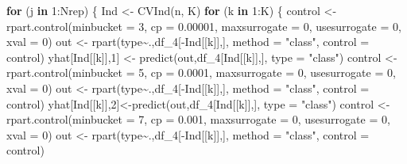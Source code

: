 \documentclass[
]{article}
\newenvironment{Shaded}{\begin{snugshade}}{\end{snugshade}}
\newcommand{\AttributeTok}[1]{\textcolor[rgb]{0.77,0.63,0.00}{#1}}
\newcommand{\ControlFlowTok}[1]{\textcolor[rgb]{0.13,0.29,0.53}{\textbf{#1}}}
\newcommand{\DecValTok}[1]{\textcolor[rgb]{0.00,0.00,0.81}{#1}}
\newcommand{\FloatTok}[1]{\textcolor[rgb]{0.00,0.00,0.81}{#1}}
\newcommand{\FunctionTok}[1]{\textcolor[rgb]{0.00,0.00,0.00}{#1}}
\newcommand{\NormalTok}[1]{#1}
\newcommand{\OtherTok}[1]{\textcolor[rgb]{0.56,0.35,0.01}{#1}}
\newcommand{\SpecialCharTok}[1]{\textcolor[rgb]{0.00,0.00,0.00}{#1}}
\newcommand{\StringTok}[1]{\textcolor[rgb]{0.31,0.60,0.02}{#1}}
\begin{document}
\begin{Shaded}
\begin{Highlighting}[]
\ControlFlowTok{for}\NormalTok{ (j }\ControlFlowTok{in} \DecValTok{1}\SpecialCharTok{:}\NormalTok{Nrep) \{}
\NormalTok{  Ind }\OtherTok{\textless{}{-}} \FunctionTok{CVInd}\NormalTok{(n, K)}
  \ControlFlowTok{for}\NormalTok{ (k }\ControlFlowTok{in} \DecValTok{1}\SpecialCharTok{:}\NormalTok{K) \{}
\NormalTok{    control }\OtherTok{\textless{}{-}} \FunctionTok{rpart.control}\NormalTok{(}\AttributeTok{minbucket =} \DecValTok{3}\NormalTok{, }\AttributeTok{cp =} \FloatTok{0.00001}\NormalTok{, }\AttributeTok{maxsurrogate =} \DecValTok{0}\NormalTok{, }\AttributeTok{usesurrogate =} \DecValTok{0}\NormalTok{, }\AttributeTok{xval =} \DecValTok{0}\NormalTok{)}
\NormalTok{    out }\OtherTok{\textless{}{-}} \FunctionTok{rpart}\NormalTok{(type}\SpecialCharTok{\textasciitilde{}}\NormalTok{.,df\_4[}\SpecialCharTok{{-}}\NormalTok{Ind[[k]],], }\AttributeTok{method =} \StringTok{"class"}\NormalTok{, }\AttributeTok{control =}\NormalTok{ control)}
\NormalTok{    yhat[Ind[[k]],}\DecValTok{1}\NormalTok{] }\OtherTok{\textless{}{-}} \FunctionTok{predict}\NormalTok{(out,df\_4[Ind[[k]],], }\AttributeTok{type =} \StringTok{"class"}\NormalTok{)}
\NormalTok{    control }\OtherTok{\textless{}{-}} \FunctionTok{rpart.control}\NormalTok{(}\AttributeTok{minbucket =} \DecValTok{5}\NormalTok{, }\AttributeTok{cp =} \FloatTok{0.0001}\NormalTok{, }\AttributeTok{maxsurrogate =} \DecValTok{0}\NormalTok{, }\AttributeTok{usesurrogate =} \DecValTok{0}\NormalTok{, }\AttributeTok{xval =} \DecValTok{0}\NormalTok{)}
\NormalTok{    out }\OtherTok{\textless{}{-}} \FunctionTok{rpart}\NormalTok{(type}\SpecialCharTok{\textasciitilde{}}\NormalTok{.,df\_4[}\SpecialCharTok{{-}}\NormalTok{Ind[[k]],], }\AttributeTok{method =} \StringTok{"class"}\NormalTok{, }\AttributeTok{control =}\NormalTok{ control)}
\NormalTok{    yhat[Ind[[k]],}\DecValTok{2}\NormalTok{]}\OtherTok{\textless{}{-}}\FunctionTok{predict}\NormalTok{(out,df\_4[Ind[[k]],], }\AttributeTok{type =} \StringTok{"class"}\NormalTok{)}
\NormalTok{    control }\OtherTok{\textless{}{-}} \FunctionTok{rpart.control}\NormalTok{(}\AttributeTok{minbucket =} \DecValTok{7}\NormalTok{, }\AttributeTok{cp =} \FloatTok{0.001}\NormalTok{, }\AttributeTok{maxsurrogate =} \DecValTok{0}\NormalTok{, }\AttributeTok{usesurrogate =} \DecValTok{0}\NormalTok{, }\AttributeTok{xval =} \DecValTok{0}\NormalTok{)}
\NormalTok{    out }\OtherTok{\textless{}{-}} \FunctionTok{rpart}\NormalTok{(type}\SpecialCharTok{\textasciitilde{}}\NormalTok{.,df\_4[}\SpecialCharTok{{-}}\NormalTok{Ind[[k]],], }\AttributeTok{method =} \StringTok{"class"}\NormalTok{, }\AttributeTok{control =}\NormalTok{ control)}

\end{Highlighting}
\end{Shaded}
\end{document}
